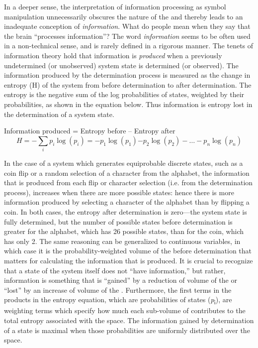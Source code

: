 In a deeper sense, the interpretation of information processing as symbol manipulation unnecessarily obscures the nature of the  and thereby leads to an inadequate conception of \textit{information}. What do people mean when they say that the brain “processes information”? The word \textit{information} seems to be often used in a non-technical sense, and is rarely defined in a rigorous manner. The tenets of information theory \citep{Shannon1948} hold that information is \textit{produced} when a previously undetermined (or unobserved) system state is determined (or observed). The information produced by the determination process is measured as the change in entropy (H) of the system from before determination to after determination. The entropy is the negative sum of the log probabilities of states, weighted by their probabilities, as shown in the equation below. Thus information is entropy lost in the determination of a system state.

\ea
  Information produced = Entropy before – Entropy after
$$
H=-\sum _{i}{{p}_{i}\log \left({p}_{i}\right)={-p}_{1}\log \left({p}_{1}\right){-p}_{2}\log \left({p}_{2}\right)-{\dots}-{p}_{n}\log \text{⁡}\left({p}_{n}\right)}
$$
\z

In the case of a system which generates equiprobable discrete states, such as a coin flip or a random selection of a character from the alphabet, the information that is produced from each flip or character selection (i.e. from the determination process), increases when there are more possible states: hence there is more information produced by selecting a character of the alphabet than by flipping a coin. In both cases, the entropy after determination is zero—the system state is fully determined, but the number of possible states before determination is greater for the alphabet, which has 26 possible states, than for the coin, which has only 2. The same reasoning can be generalized to continuous variables, in which case it is the probability-weighted volume of the  before determination that matters for calculating the information that is produced. It is crucial to recognize that a state of the system itself does not “have information,” but rather, information is something that is “gained” by a reduction of volume of the  or “lost” by an increase of volume of the . Furthermore, the first terms in the products in the entropy equation, which are probabilities of states (\textit{p}\textsubscript{i}), are weighting terms which specify how much each sub-volume of  contributes to the total entropy associated with the space. The information gained by determination of a state is maximal when those probabilities are uniformly distributed over the space.

